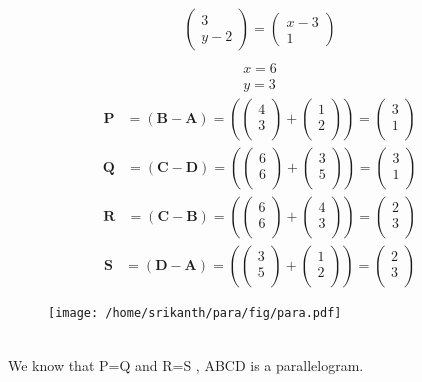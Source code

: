 \documentclass[12pt]{article}
\providecommand{\brak}[1]{\ensuremath{\left(#1\right)}}
\newcommand{\myvec}[1]{\ensuremath{\begin{pmatrix}#1\end{pmatrix}}}
\let\vec\mathbf
\begin{document}
 \begin{align} 
 \myvec{3\\y-2}=\myvec{x-3\\1}\\
 \end{align}
 \begin{align} 
   x=6 \\ y=3
 \end{align}
 \begin{align}
 \vec{P} &= \brak{\vec{B}-\vec{A}} = \brak{\myvec{
  4 \\
  3 \\
 } + \myvec{
  1 \\
  2\\
 } 
 } = \myvec{
 3\\
 1\\
 }  
 \end{align}
 \begin{align}
 \vec{Q} &= \brak{\vec{C}-\vec{D}} = \brak{\myvec{
  6 \\
  6 \\
 } + \myvec{
  3 \\
  5\\
 } 
 } = \myvec{
 3\\
 1\\
 }
 \end{align}
 \begin{align}
 \vec{R} &= \brak{\vec{C}-\vec{B}} = \brak{\myvec{
  6 \\
  6 \\
 } + \myvec{
  4 \\
  3\\
 } 
 } = \myvec{
 2\\
 3\\
 } 
 \end{align}
 \begin{align}
 \vec{S} &= \brak{\vec{D}-\vec{A}} = \brak{\myvec{
  3 \\
  5 \\
 } + \myvec{
  1 \\
  2\\
 } 
 } = \myvec{
 2\\
 3\\
 } 
\end{align}
\begin{figure}[h!]
	\begin{center}
  \texttt{[image: /home/srikanth/para/fig/para.pdf]}
	\end{center}
\caption{}
\label{fig:Fig3}
\end{figure}\\
We know that P=Q and R=S , ABCD is a parallelogram. 
\
\end{document}
